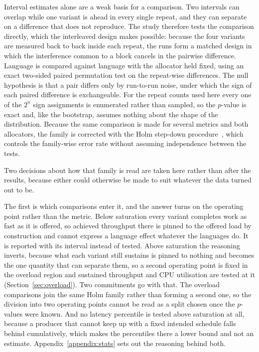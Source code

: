 Interval estimates alone are a weak basis for a comparison. Two intervals can overlap while one
variant is ahead in every single repeat, and they can separate on a difference that does not
reproduce. The study therefore tests the comparison directly, which the interleaved design makes
possible: because the four variants are measured back to back inside each repeat, the runs form
a matched design in which the interference common to a block cancels in the pairwise difference.
Language is compared against language with the allocator held fixed, using an exact two-sided
paired permutation test on the repeat-wise differences. The null hypothesis is that a pair
differs only by run-to-run noise, under which the sign of each paired difference is
exchangeable. For the repeat counts used here every one of the $2^{n}$ sign assignments is
enumerated rather than sampled, so the $p$-value is exact and, like the bootstrap, assumes
nothing about the shape of the distribution. Because the same comparison is made for several
metrics and both allocators, the family is corrected with the Holm step-down
procedure~\cite{holm1979simple}, which controls the family-wise error rate without assuming
independence between the tests.

Two decisions about how that family is read are taken here rather than after the results,
because either could otherwise be made to suit whatever the data turned out to be.

The first is which comparisons enter it, and the answer turns on the operating point rather than
the metric. Below saturation every variant completes work as fast as it is offered, so achieved
throughput there is pinned to the offered load by construction and cannot express a language
effect whatever the languages do. It is reported with its interval instead of tested. Above
saturation the reasoning inverts, because what each variant still sustains is pinned to nothing
and becomes the one quantity that can separate them, so a second operating point is fixed in the
overload region and sustained throughput and CPU utilisation are tested at it
(Section~\ref{sec:overload}). Two commitments go with that. The overload comparisons join the
same Holm family rather than forming a second one, so the division into two operating points
cannot be read as a split chosen once the $p$-values were known. And no latency percentile is
tested above saturation at all, because a producer that cannot keep up with a fixed intended
schedule falls behind cumulatively, which makes the percentiles there a lower bound and not an
estimate. Appendix~\ref{appendix:stats} sets out the reasoning behind both.

